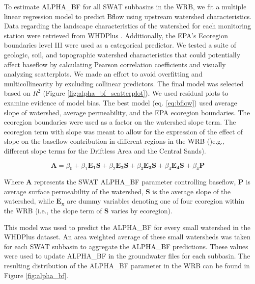 	To estimate ALPHA\_BF for all SWAT subbasins in the WRB, we fit a multiple linear regression model to predict Bflow using upstream watershed characteristics. Data regarding the landscape characteristics of the watershed for each monitoring station were retrieved from WHDPlus \citep{wdnr_whdplus_2013}. Additionally, the EPA's Ecoregion boundaries level III were used as a categorical predictor. We tested a suite of geologic, soil, and topographic watershed characteristics that could potentially affect baseflow by calculating Pearson correlation coefficients and visually analyzing scatterplots. We made an effort to avoid overfitting and multicollinearity by excluding collinear predictors. The final model was selected based on $R^2$ (Figure \ref{fig:alpha_bf_scatterplot}). We used residual plots to examine evidence of model bias. The best model (eq. \ref{eq:bflow}) used average slope of watershed, average permeability, and the EPA ecoregion boundaries. The ecoregion boundaries were used as a factor on the watershed slope term. The ecoregion term with slope was meant to allow for the expression of the effect of slope on the baseflow contribution in different regions in the WRB ()e.g., different slope terms for the Driftless Area and the Central Sands).

	\begin{equation}
	\bm{A} = \beta_0 + 
		\beta_1 \bm{E_1} \bm{S} +
		\beta_2 \bm{E_2} \bm{S} + 
		\beta_3 \bm{E_3} \bm{S} +
		\beta_4 \bm{E_4} \bm{S} +
		\beta_4 \bm{P}
		\label{eq:bflow}
	\end{equation}
	
	Where $\bm{A}$ represents the SWAT ALPHA\_BF parameter controlling baseflow, $\bm{P}$ is average surface permeability of the watershed, $\bm{S}$ is the average slope of the watershed, while $\bm{E_x}$ are dummy variables denoting one of four ecoregion within the WRB (i.e., the slope term of $\bm{S}$ varies by ecoregion).
	
	This model was used to predict the ALPHA\_BF for every small watershed in the WHDPlus dataset. An area weighted average of these small watersheds was taken for each SWAT subbasin to aggregate the ALPHA\_BF predictions. These values were used to update ALPHA\_BF in the groundwater files for each subbasin. The resulting distribution of the ALPHA\_BF parameter in the WRB can be found in Figure \ref{fig:alpha_bf}.
	